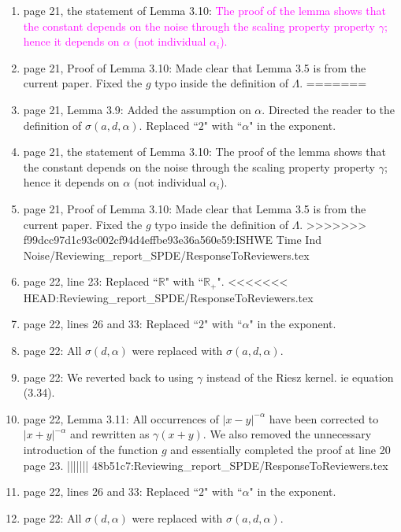 \documentclass[12pt]{article}%
\theoremstyle{plain}
\theoremstyle{definition}
\def\R{\mathbb{R}}
\numberwithin{equation}{section}
\begin{document}
\begin{enumerate}
    definition of $\sigma(a,d,\alpha)$. Replaced ``$2$" with ``$\alpha$" in the exponent.
  \item[38.] page 21, the statement of Lemma 3.10: \textcolor{magenta}{The proof of the lemma shows
    that the constant depends on the noise through the scaling property property $\gamma$; hence it
  depends on $\alpha$ (not individual $\alpha_i$). }
  \item[39.] page 21, Proof of Lemma 3.10: Made clear that Lemma 3.5 is from the current paper.
    Fixed the $g$ typo inside the definition of $\Lambda$.
=======
  \item[37.] page 21, Lemma 3.9: Added the assumption on $\alpha$. Directed the reader to the
    definition of $\sigma(a,d,\alpha)$. Replaced ``$2$" with ``$\alpha$" in the exponent.
  \item[38.] page 21, the statement of Lemma 3.10: The proof of the lemma shows
    that the constant depends on the noise through the scaling property property $\gamma$; hence it
  depends on $\alpha$ (not individual $\alpha_i$). 
  \item[39.] page 21, Proof of Lemma 3.10: Made clear that Lemma 3.5 is from the current paper.
    Fixed the $g$ typo inside the definition of $\Lambda$.
>>>>>>> f99dcc97d1c93c002cf94d4effbe93e36a560e59:ISHWE Time Ind Noise/Reviewing_report_SPDE/ResponseToReviewers.tex
  \item[40.] page 22, line 23: Replaced ``$\R$" with ``$\R_+$".
<<<<<<< HEAD:Reviewing_report_SPDE/ResponseToReviewers.tex
  \item[41.] page 22, lines 26 and 33: Replaced ``$2$" with ``$\alpha$" in the
    exponent.
  \item[42.] page 22: All $\sigma(d,\alpha)$ were replaced with
    $\sigma(a,d,\alpha)$.
  \item[43.] page 22: We reverted back to using $\gamma$ instead of the Riesz
    kernel. ie equation (3.34).
  \item[44.] page 22, Lemma 3.11: All occurrences of $|x-y|^{-\alpha}$ have
    been corrected to $|x+y|^{-\alpha}$ and rewritten as $\gamma(x+y)$. We also
    removed the unnecessary introduction of the function $g$ and essentially
    completed the proof at line 20 page 23.
||||||| 48b51c7:Reviewing_report_SPDE/ResponseToReviewers.tex
  \item[41.] page 22, lines 26 and 33: Replaced ``$2$" with ``$\alpha$" in the exponent.
  \item[42.] page 22: All $\sigma(d,\alpha)$ were replaced with $\sigma(a,d,\alpha)$.

\end{enumerate}
\end{document}
